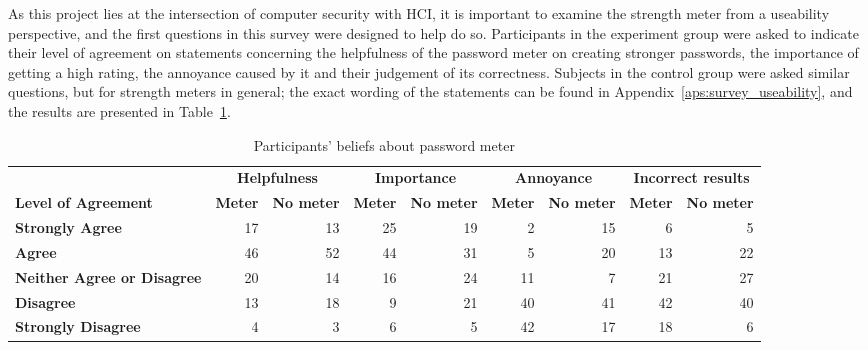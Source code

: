     As this project lies at the intersection of computer security with HCI, it is important to examine the strength meter from a useability perspective, and the first questions in this survey were designed to help do so. Participants in the experiment group were asked to indicate their level of agreement on statements concerning the helpfulness of the password meter on creating stronger passwords, the importance of getting a high rating, the annoyance caused by it and their judgement of its correctness. Subjects in the control group were asked similar questions, but for strength meters in general; the exact wording of the statements can be found in Appendix~\ref{aps:survey_useability}, and the results are presented in Table~\ref{tab:beliefs}.

    \begin{table}[htpb]
      \centering
      \scriptsize
      \hspace*{-2cm}
      \begin{tabular}{p{3cm} rrrrrrrr}
        \toprule
         & \multicolumn{2}{c}{\textbf{Helpfulness}} & \multicolumn{2}{c}{\textbf{Importance}} & \multicolumn{2}{c}{\textbf{Annoyance}} & \multicolumn{2}{c}{\textbf{Incorrect results}} \\
        \textbf{Level of Agreement} & \textbf{Meter} & \textbf{No meter} & \textbf{Meter} & \textbf{No meter} & \textbf{Meter} & \textbf{No meter} & \textbf{Meter} & \textbf{No meter} \\
        \midrule
         \textbf{Strongly Agree} & 17 & 13 & 25 & 19 & 2 & 15 & 6 & 5 \\
         \textbf{Agree} & 46 & 52 & 44 & 31 & 5 & 20 & 13 & 22 \\
         \textbf{Neither Agree \newline or Disagree} & 20 & 14 & 16 & 24 & 11 & 7 & 21 & 27 \\
         \textbf{Disagree} & 13 & 18 & 9 & 21 & 40 & 41 & 42 & 40 \\
         \textbf{Strongly Disagree} & 4 & 3 & 6 & 5 & 42 & 17 & 18 & 6\\
        \bottomrule
      \end{tabular}
      \caption{Participants' beliefs about password meter}
      \label{tab:beliefs}
    \end{table}

